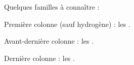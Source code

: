 \begin{encart}
  Quelques familles à connaître : 
  \begin{listePoints}
    \item Première colonne (sauf hydrogène) : 
    les .
    \item Avant-dernière colonne : 
    les .
    \item Dernière colonne : 
    les .
  \end{listePoints}
\end{encart}

